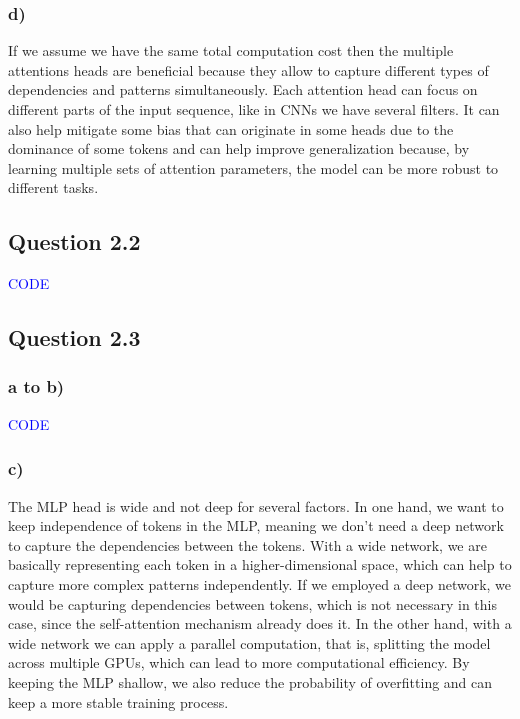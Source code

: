 \documentclass{article}
\begin{document}
\subsubsection*{d)}

If we assume we have the same total computation cost then the multiple attentions heads are beneficial because they allow
to capture different types of dependencies and patterns simultaneously. Each attention head can focus on different parts of the
input sequence, like in CNNs we have several filters. It can also help mitigate some bias that can originate in some
heads due to the dominance of some tokens and can help improve generalization because, by learning multiple sets of
attention parameters, the model can be more robust to different tasks.


\subsection*{Question 2.2}

\textcolor{blue}{CODE}

\subsection*{Question 2.3}

\subsubsection*{a to b)}
\textcolor{blue}{CODE}

\subsubsection*{c)}

The MLP head is wide and not deep for several factors.
In one hand, we want to keep independence of tokens in the MLP, meaning we don't need a deep network to capture
the dependencies between the tokens. With a wide network, we are basically representing each token in a higher-dimensional
space, which can help to capture more complex patterns independently. If we employed a deep network, we would be
capturing dependencies between tokens, which is not necessary in this case, since the self-attention mechanism already
does it.
In the other hand, with a wide network we can apply a parallel computation, that is, splitting the model across multiple
GPUs, which can lead to more computational efficiency. By keeping the MLP shallow, we also reduce the probability of overfitting
and can keep a more stable training process.
\end{document}
